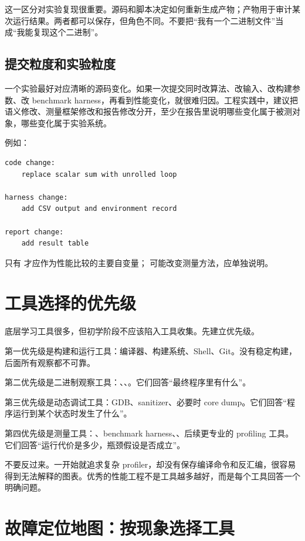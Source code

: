 这一区分对实验复现很重要。源码和脚本决定如何重新生成产物；产物用于审计某次运行结果。两者都可以保存，但角色不同。不要把“我有一个二进制文件”当成“我能复现这个二进制”。

\subsection{提交粒度和实验粒度}

一个实验最好对应清晰的源码变化。如果一次提交同时改算法、改输入、改构建参数、改 benchmark harness，再看到性能变化，就很难归因。工程实践中，建议把语义修改、测量框架修改和报告修改分开，至少在报告里说明哪些变化属于被测对象，哪些变化属于实验系统。

例如：

\begin{lstlisting}
code change:
    replace scalar sum with unrolled loop

harness change:
    add CSV output and environment record

report change:
    add result table
\end{lstlisting}

只有  才应作为性能比较的主要自变量； 可能改变测量方法，应单独说明。

\section{工具选择的优先级}

底层学习工具很多，但初学阶段不应该陷入工具收集。先建立优先级。

第一优先级是构建和运行工具：编译器、构建系统、Shell、Git。没有稳定构建，后面所有观察都不可靠。

第二优先级是二进制观察工具：、、。它们回答“最终程序里有什么”。

第三优先级是动态调试工具：GDB、sanitizer、必要时 core dump。它们回答“程序运行到某个状态时发生了什么”。

第四优先级是测量工具：、benchmark harness、、后续更专业的 profiling 工具。它们回答“运行代价是多少，瓶颈假设是否成立”。

不要反过来。一开始就追求复杂 profiler，却没有保存编译命令和反汇编，很容易得到无法解释的图表。优秀的性能工程不是工具越多越好，而是每个工具回答一个明确问题。

\section{故障定位地图：按现象选择工具}

